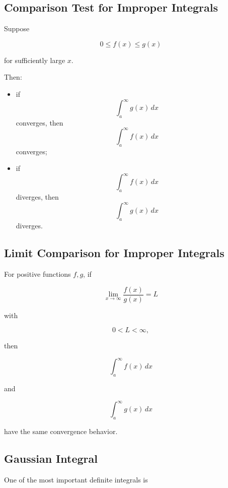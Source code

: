 \subsection{Comparison Test for Improper Integrals}
\label{subsec:comparison-test-improper-integrals}

Suppose

\[
0\leq f(x)\leq g(x)
\]

for sufficiently large \(x\).

Then:

\begin{itemize}
    \item if
    \[
    \int_a^\infty g(x)\,dx
    \]
    converges, then
    \[
    \int_a^\infty f(x)\,dx
    \]
    converges;

    \item if
    \[
    \int_a^\infty f(x)\,dx
    \]
    diverges, then
    \[
    \int_a^\infty g(x)\,dx
    \]
    diverges.
\end{itemize}

\subsection{Limit Comparison for Improper Integrals}
\label{subsec:limit-comparison-integrals}

For positive functions \(f,g\), if

\[
\boxed{
\lim_{x\to\infty}
\frac{
f(x)
}{
g(x)
}
=
L
}
\]

with

\[
0<L<\infty,
\]

then

\[
\int_a^\infty f(x)\,dx
\]

and

\[
\int_a^\infty g(x)\,dx
\]

have the same convergence behavior.

\subsection{Gaussian Integral}
\label{subsec:gaussian-integral-reference}

One of the most important definite integrals is

